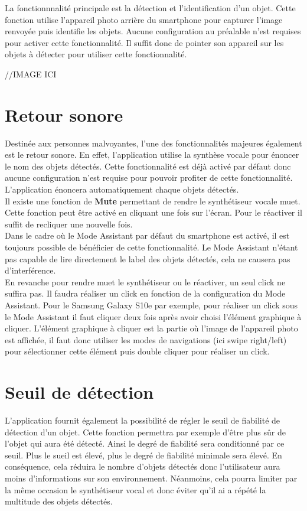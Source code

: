 \documentclass[UTF8]{EPURapport}
\begin{document}
La fonctionnnalité principale est la détection et l'identification d'un objet. Cette fonction utilise l'appareil photo arrière du smartphone pour capturer l'image renvoyée puis identifie les objets. Aucune configuration au préalable n'est requises pour activer cette fonctionnalité. Il suffit donc de pointer son appareil sur les objets à détecter pour utiliser cette fonctionnalité.

//IMAGE ICI
\section{Retour sonore}

Destinée aux personnes malvoyantes, l'une des fonctionnalités majeures également est le retour sonore. En effet, l'application utilise la synthèse vocale pour énoncer le nom des objets détectés. Cette fonctionnalité est déjà activé par défaut donc aucune configuration n'est requise pour pouvoir profiter de cette fonctionnalité. L'application énoncera automatiquement chaque objets détectés.\\

Il existe une fonction de \textbf{Mute} permettant de rendre le synthétiseur vocale muet. Cette fonction peut être activé en cliquant une fois sur l'écran. Pour le réactiver il suffit de recliquer une nouvelle fois.\\

Dans le cadre où le Mode Assistant par défaut du smartphone est activé, il est toujours possible de bénéficier de cette fonctionnalité. Le Mode Assistant n'étant pas capable de lire directement le label des objets détectés, cela ne causera pas d'interférence. \\

En revanche pour rendre muet le synthétiseur ou le réactiver, un seul click ne suffira pas. Il faudra réaliser un click en fonction de la configuration du Mode Assistant. Pour le Samsung Galaxy S10e par exemple, pour réaliser un click sous le Mode Assistant il faut cliquer deux fois après avoir choisi l'élément graphique à cliquer. L'élément graphique à cliquer est la partie où l'image de l'appareil photo est affichée, il faut donc utiliser les modes de navigations (ici swipe right/left) pour sélectionner cette élément puis double cliquer pour réaliser un click.

\section{Seuil de détection}

L'application fournit également la possibilité de régler le seuil de fiabilité de détection d'un objet. Cette fonction permettra par exemple d'être plus sûr de l'objet qui aura été détecté. Ainsi le degré de fiabilité sera conditionné par ce seuil. Plus le sueil est élevé, plus le degré de fiabilité minimale sera élevé. En conséquence, cela réduira le nombre d'objets détectés donc l'utilisateur aura moins d'informations sur son environnement. Néanmoins, cela pourra limiter par la même occasion le synthétiseur vocal et donc éviter qu'il ai a répété la multitude des objets détectés.
\end{document}

